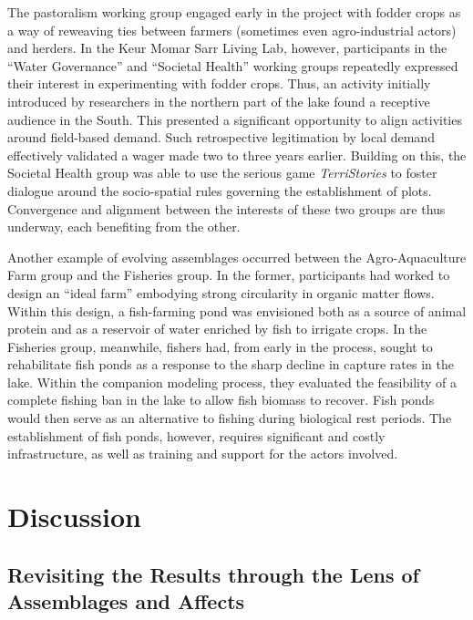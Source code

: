 \documentclass{article}
\begin{document}
The pastoralism working group engaged early in the project with fodder crops as a way of reweaving ties between farmers (sometimes even agro-industrial actors) and herders. In the Keur Momar Sarr Living Lab, however, participants in the “Water Governance” and “Societal Health” working groups repeatedly expressed their interest in experimenting with fodder crops. Thus, an activity initially introduced by researchers in the northern part of the lake found a receptive audience in the South. This presented a significant opportunity to align activities around field-based demand. Such retrospective legitimation by local demand effectively validated a wager made two to three years earlier. Building on this, the Societal Health group was able to use the serious game \textit{TerriStories} to foster dialogue around the socio-spatial rules governing the establishment of plots. Convergence and alignment between the interests of these two groups are thus underway, each benefiting from the other.  

Another example of evolving assemblages occurred between the Agro-Aquaculture Farm group and the Fisheries group. In the former, participants had worked to design an “ideal farm” embodying strong circularity in organic matter flows. Within this design, a fish-farming pond was envisioned both as a source of animal protein and as a reservoir of water enriched by fish to irrigate crops. In the Fisheries group, meanwhile, fishers had, from early in the process, sought to rehabilitate fish ponds as a response to the sharp decline in capture rates in the lake. Within the companion modeling process, they evaluated the feasibility of a complete fishing ban in the lake to allow fish biomass to recover. Fish ponds would then serve as an alternative to fishing during biological rest periods. The establishment of fish ponds, however, requires significant and costly infrastructure, as well as training and support for the actors involved.  

\section{Discussion}

\subsection{Revisiting the Results through the Lens of Assemblages and Affects}
\end{document}
